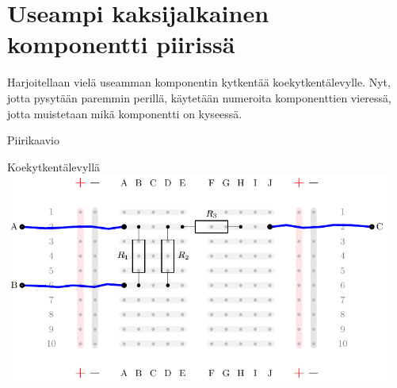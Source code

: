 \section{Useampi kaksijalkainen komponentti piirissä}

Harjoitellaan vielä useamman komponentin kytkentää koekytkentälevylle. Nyt, jotta pysytään paremmin perillä, käytetään numeroita komponenttien vieressä, jotta muistetaan mikä komponentti on kyseessä.

\begin{center}
Piirikaavio\\

Koekytkentälevyllä\\
\includegraphics[width=0.95\textwidth]{kuvat/kuva3.pdf}
\end{center}


